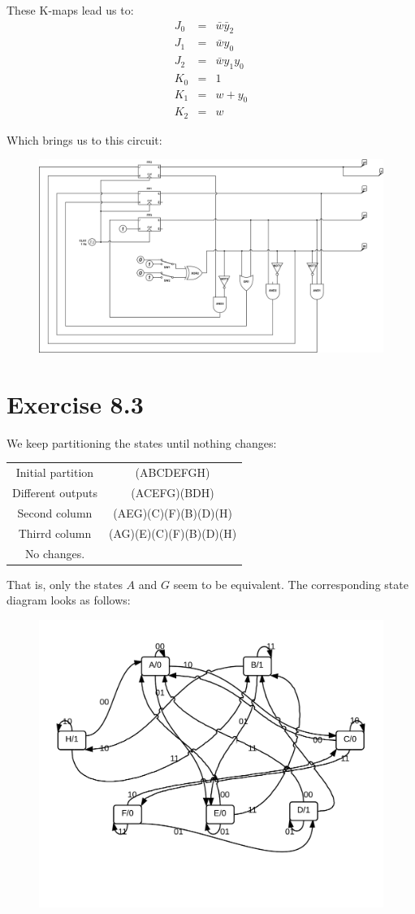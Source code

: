 \documentclass[10pt,a4paper]{scrartcl}
\newcommand{\subExercise}[1]{\vspace{0.5em} \noindent{\bf #1)}}
\begin{document}
These K-maps lead us to:
\begin{eqnarray*}
    J_0 &=& \bar w\bar y_2\\
    J_1 &=& \bar wy_0\\
    J_2 &=& \bar wy_1y_0\\
    K_0 &=& 1\\
    K_1 &=& w+y_0\\
    K_2 &=& w
\end{eqnarray*}

Which brings us to this circuit:
\begin{figure}[h]
\includegraphics[width=\textwidth]{images/8_2-4counter.png} 
\end{figure}

\FloatBarrier
\section*{Exercise 8.3}
\subExercise{a}
We keep partitioning the states until nothing changes: 

\begin{tabular}{|c|c|}
  \hline
  Initial partition & (ABCDEFGH) \\
  Different outputs & (ACEFG)(BDH) \\
  Second column & (AEG)(C)(F)(B)(D)(H) \\
  Thirrd column & (AG)(E)(C)(F)(B)(D)(H) \\
  No changes. & \\
  \hline
\end{tabular}

That is, only the states $A$ and $G$ seem to be equivalent.
The corresponding state diagram looks as follows:

\begin{figure}[hb]
  \centering\includegraphics[width=0.6\linewidth]{images/minimized_diagram.png}
\end{figure}
\end{document}
